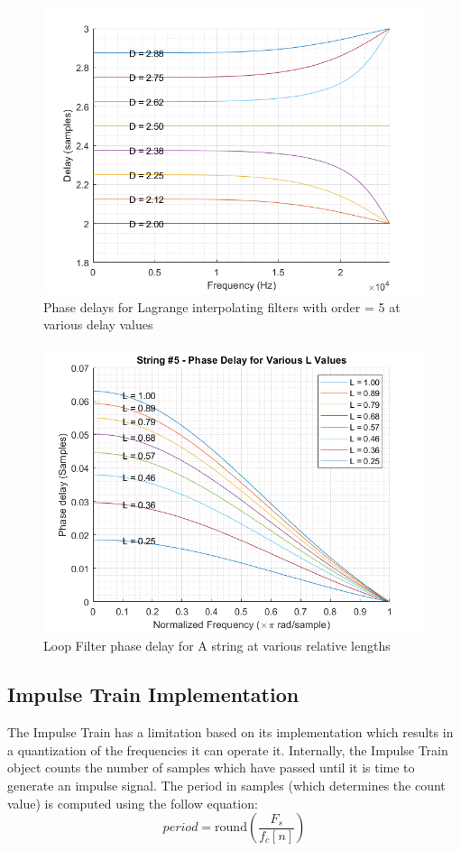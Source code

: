 \documentclass[../main.tex]{subfiles}
\begin{document}
\begin{figure}[h]
    \centering
    \includegraphics[scale=.65]{./images/plots/LagrangePhaseDelays.png}
    \caption{Phase delays for Lagrange interpolating filters with order = 5 at various delay values}
    \label{fig:LagrangePhaseDelays}
\end{figure}

\begin{figure}[h]
    \centering
    \includegraphics[scale=.65]{./images/plots/String 5 - Phase Delays.png}
    \caption{Loop Filter phase delay for A string at various relative lengths}
    \label{fig:Str5PhaseDelays}
\end{figure}

\subsection{Impulse Train Implementation}
The Impulse Train has a limitation based on its implementation which results in a quantization of the frequencies it can operate it. Internally, the Impulse Train object counts the number of samples which have passed until it is time to generate an impulse signal. The period in samples (which determines the count value) is computed using the follow equation:
\begin{equation}
    period = \text{round}\left(\frac{F_s}{f_c[n]}\right)
    \label{eq:f_cQuantization}
\end{equation}
\end{document}
